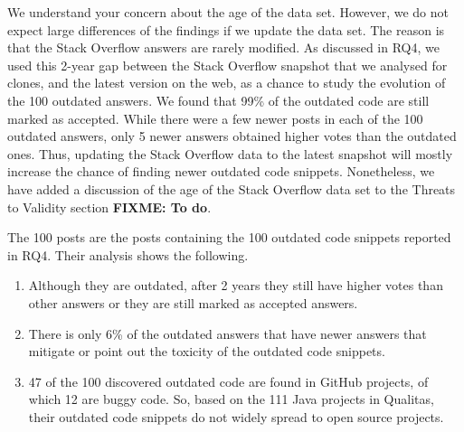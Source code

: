 \documentclass[a4paper,twoside,10pt]{reviewresponse}
\newcommand\FIXME[1]{{\color{red}\textbf{FIXME: #1}}}
\begin{document}

We understand your concern about the age of the data set. However, we do not expect large differences of the findings if we update the data set. The reason is that the Stack Overflow answers are rarely modified. As discussed in RQ4, we used this 2-year gap between the Stack Overflow snapshot that we analysed for clones, and the latest version on the web, as a chance to study the evolution of the 100 outdated answers. We found that 99\% of the outdated code are still marked as accepted. While there were a few newer posts in each of the 100 outdated answers, only 5 newer answers obtained higher votes than the outdated ones. Thus, updating the Stack Overflow data to the latest snapshot will mostly increase the chance of finding newer outdated code snippets.
Nonetheless, we have added a discussion of the age of the Stack Overflow data set to the Threats to Validity section \FIXME{To do}.

The 100 posts are the posts containing the 100 outdated code snippets reported in RQ4. Their analysis shows the following. 
\begin{enumerate}
	\item Although they are outdated, after 2 years they still have higher votes than other answers or they are still marked as accepted answers.
	\item There is only 6\% of the outdated answers that have newer answers that mitigate or point out the toxicity of the outdated code snippets. 
	\item 47 of the 100 discovered outdated code are found in GitHub projects, of which 12 are buggy code. So, based on the 111 Java projects in Qualitas, their outdated code snippets do not widely spread to open source projects.
\end{enumerate}

\end{document}
